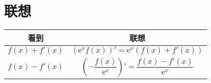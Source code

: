 \newpage
\section{联想}

 {
  \tabulinesep=1.2mm
  \begin{tabu}{|c|c|}
      \hline
      看到         & 联想                                                                             \\ \hline
      $f(x)+f'(x)$ & $(\mathrm{e}^xf(x))' = \mathrm{e}^x(f(x) + f'(x))$                               \\ \hline
      $f(x)-f'(x)$ & $\left(-\dfrac{f(x)}{\mathrm{e}^x}\right)' = \dfrac{f(x) - f'(x)}{\mathrm{e}^x}$ \\ \hline
  \end{tabu}
 }

